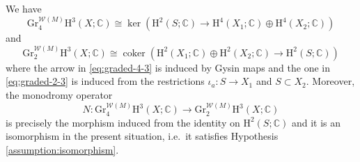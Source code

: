 \begin{lemma}
\label{lem:monodromy-isomorphism}
We have
\begin{equation}
\label{eq:graded-4-3}
\mathrm{Gr}_{4}^{\mathcal{W}(M)}\mathrm{H}^{3}(X;\mathbb{C})
\cong \operatorname{ker}\left(\mathrm{H}^{2}(S;\mathbb{C})\to 
\mathrm{H}^{4}(X_{1};\mathbb{C})\oplus\mathrm{H}^{4}(X_{2};\mathbb{C})\right)
\end{equation}
and
\begin{equation}
\label{eq:graded-2-3}
\mathrm{Gr}_{2}^{\mathcal{W}(M)}\mathrm{H}^{3}(X;\mathbb{C})
\cong \operatorname{coker}\left(
\mathrm{H}^{2}(X_{1};\mathbb{C})\oplus\mathrm{H}^{2}(X_{2};\mathbb{C})
\to\mathrm{H}^{2}(S;\mathbb{C})\right)
\end{equation}
where the arrow in \eqref{eq:graded-4-3} is induced by Gysin maps and
the one in \eqref{eq:graded-2-3} is induced from the restrictions
\(\iota_{a}\colon S\to X_{1}\) and \(S\subset X_{2}\). Moreover, the
monodromy operator 
\begin{equation}
N\colon \mathrm{Gr}_{4}^{\mathcal{W}(M)}
\mathrm{H}^{3}(X;\mathbb{C})
\to \mathrm{Gr}_{2}^{\mathcal{W}(M)}
\mathrm{H}^{3}(X;\mathbb{C})
\end{equation}
is precisely the morphism induced from the identity on \(\mathrm{H}^{2}(S;\mathbb{C})\)
and it is an isomorphism in the present situation, i.e.~it satisfies
Hypothesis \ref{assumption:isomorphism}.
\end{lemma}
